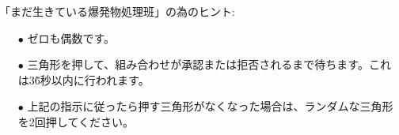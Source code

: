 「まだ生きている爆発物処理班」の為のヒント:
\begin{itemize}
    \item[$\bullet$] ゼロも偶数です。
    \item[$\bullet$] 三角形を押して{、}組み合わせが承認または拒否されるまで待ちます。これは3\~6秒以内に行われます。
    \item[$\bullet$] 上記の指示に従ったら押す三角形がなくなった場合は{、}ランダムな三角形を2回押してください。
\end{itemize}

